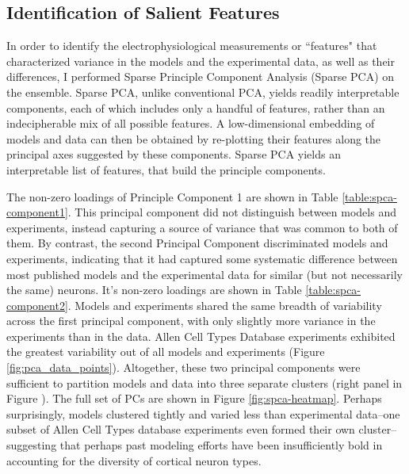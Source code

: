 \subsection{Identification of Salient Features}
In order to identify the electrophysiological measurements or ``features" that characterized variance in the models and the experimental data, as well as their differences, I performed Sparse Principle Component Analysis (Sparse PCA) \citep{zou2006sparse} on the ensemble.
Sparse PCA, unlike conventional PCA, yields readily interpretable components, each of which includes only a handful of features, rather than an indecipherable mix of all possible features. 
A low-dimensional embedding of models and data can then be obtained by re-plotting their features along the principal axes suggested by these components.
Sparse PCA yields an interpretable list of features, that build the principle components.

The non-zero loadings of Principle Component 1 are shown in Table \ref{table:spca-component1}.
This principal component did not distinguish between models and experiments, instead capturing a source of variance that was common to both of them.
By contrast, the second Principal Component discriminated models and experiments, indicating that it had captured some systematic difference between most published models and the experimental data for similar (but not necessarily the same) neurons.
It's non-zero loadings are shown in Table \ref{table:spca-component2}.
Models and experiments shared the same breadth of variability across the first principal component, with only slightly more variance in the experiments than in the data.
Allen Cell Types Database experiments exhibited the greatest variability out of all models and experiments (Figure \ref{fig:pca_data_points}).
Altogether, these two principal components were sufficient to partition models and data into three separate clusters (right panel in Figure \label{fig:pca_data_points}).
The full set of PCs are shown in Figure \ref{fig:spca-heatmap}.
Perhaps surprisingly, models clustered tightly and varied less than experimental data--one subset of Allen Cell Types database experiments even formed their own cluster--suggesting that perhaps past modeling efforts have been insufficiently bold in accounting for the diversity of cortical neuron types.

